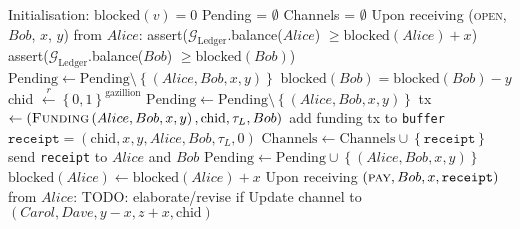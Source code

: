\begin{algorithm}
  \caption{$\mathcal{F}_{\mathrm{PayNet}}$}
  \label{alg:payfunc}
  \begin{algorithmic}[1]
    \State Initialisation:
      \Indent
        \State $\mathrm{blocked}\left(v\right) = 0$
      \EndFor
      \State Pending = $\emptyset$
      \State Channels = $\emptyset$
      \EndIndent
    \State
    \State Upon receiving (\textsc{open}, $Bob$, $x$, $y$) from $Alice$:
    \Indent
        \State assert($\mathcal{G}_{\mathrm{Ledger}}$.balance($Alice$) $\geq
        \mathrm{blocked}\left(Alice\right) + x$)
        \State assert($\mathcal{G}_{\mathrm{Ledger}}$.balance($Bob$) $\geq
        \mathrm{blocked}\left(Bob\right)$)
        \State $\mathrm{Pending} \leftarrow \mathrm{Pending} \setminus
        \left\{\left(Alice, Bob, x, y\right)\right\}$
        \State $\mathrm{blocked}\left(Bob\right) = \mathrm{blocked}\left(Bob\right) - y$
        \State chid $\overset{r}{\leftarrow} \left\{0, 1\right\}^{\mathrm{gazillion}}$
        \State $\mathrm{Pending} \leftarrow \mathrm{Pending} \setminus \left\{\left(Alice,
        Bob, x, y\right)\right\}$
        \State tx $\gets \left(\textsc{Funding}\left(Alice, Bob, x, y\right),
        \mathrm{chid}, \tau_L, Bob\right)$
        \State add funding tx to \texttt{buffer}
        \State $\mathtt{receipt} = \left(\mathrm{chid}, x, y, Alice, Bob,
        \tau_L, 0\right)$
        \State $\mathrm{Channels} \leftarrow \mathrm{Channels} \cup
        \left\{\mathtt{receipt}\right\}$
        \State send \texttt{receipt} to $Alice$ and $Bob$
      \Else
        \State $\mathrm{Pending} \leftarrow \mathrm{Pending} \cup \left\{\left(Alice, Bob,
        x, y\right)\right\}$
        \State $\mathrm{blocked}\left(Alice\right) \leftarrow
        \mathrm{blocked}\left(Alice\right) + x$
      \EndIf
    \EndIndent
    \State
    \State Upon receiving $\left(\textsc{pay}, Bob, x,
    \vec{\mathtt{receipt}}\right)$ from $Alice$:
    \Indent
        \State TODO: elaborate/revise if
          \State Update channel to $\left(Carol, Dave, y - x, z + x, \mathrm{chid}\right)$

\end{algorithmic}
\end{algorithm}
